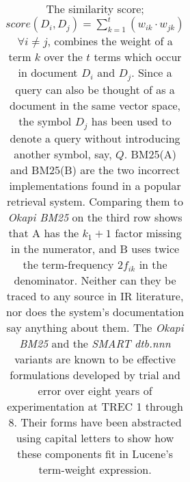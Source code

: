\begin{table}
\begin{minipage}[t]{0.65\textwidth}
\begin{tabular}{lcc}
      \label{tab:tfxidf}
    \end{tabular}
    \caption{ The similarity score;
      $score(D_{i},D_{j})=\sum_{k=1}^{t}(w_{ik} \cdot w_{jk})$
      $\forall i \neq j$, combines the weight of a term $k$ over the
      $t$ terms which occur in document $D_{i}$ and $D_{j}$. Since a
      query can also be thought of as a document in the same vector
      space, the symbol $D_{j}$ has been used to denote a query
      without introducing another symbol, say, $Q$. BM25(A) and
      BM25(B) are the two incorrect implementations found in a popular
      retrieval system. Comparing them to \emph{Okapi BM25} on the
      third row shows that A has the $k_{1}+1$ factor missing in the
      numerator, and B uses twice the term-frequency $2f_{ik}$ in the
      denominator. Neither can they be traced to any source in IR
      literature, nor does the system's documentation say anything
      about them. The \emph{Okapi BM25} and the \emph{SMART dtb.nnn}
      variants are known to be effective formulations developed by
      trial and error over eight years of experimentation at TREC 1
      through 8. Their forms have been abstracted using capital
      letters to show how these components fit in Lucene's term-weight
      expression.}

  \end{minipage}
\end{table}


